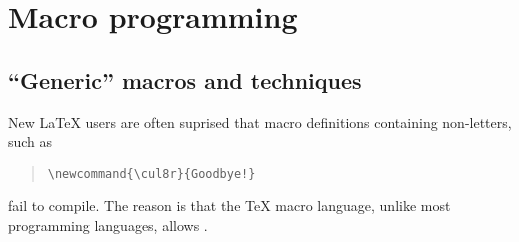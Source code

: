 
\section{Macro programming}

\subsection{``Generic'' macros and techniques}


New \LaTeX{} users are often suprised that macro definitions
containing non-letters, such as
\begin{quote}
\begin{verbatim}
\newcommand{\cul8r}{Goodbye!}
\end{verbatim}
\end{quote}
fail to compile.  The reason is that the \TeX{} macro language, unlike
most programming languages, allows %
.

